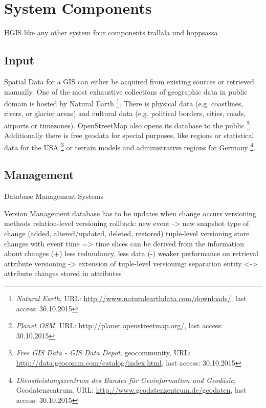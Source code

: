 

\section{System Components} %
\label{sec:system_components}

HGIS like any other system four components
trallala und hoppsassa

\subsection{Input} %
\label{sub:input}

Spatial Data for a GIS can either be acquired from existing sources or retrieved manually. One of the most exhaustive collections of geographic data in public domain is hosted by Natural Earth
\footnote{
  \textit{Natural Earth},
  URL: \url{http://www.naturalearthdata.com/downloads/},
  last access: 30.10.2015
}.
There is physical data (e.g. coastlines, rivers, or glacier areas) and cultural data (e.g. political borders, cities, roads, airports or timezones). OpenStreetMap also opens its database to the public
\footnote{
  \textit{Planet OSM},
  URL: \url{http://planet.openstreetmap.org/},
  last access: 30.10.2015
}.
Additionally there is free geodata for special purposes, like regions or statistical data for the USA
\footnote{
  \textit{Free GIS Data - GIS Data Depot},
  geocommunity,
  URL: \url{http://data.geocomm.com/catalog/index.html},
  last access: 30.10.2015
}
or terrain models and administrative regions for Germany
\footnote{
  \textit{Dienstleistungszentrum des Bundes für Geoinformation und Geodäsie},
  Geodatenzentrum,
  URL: \url{http://www.geodatenzentrum.de/geodaten},
  last access: 30.10.2015
}.


\subsection{Management} %
\label{sub:management}

Database Management Systems

Version Management
  database has to be updates when change occurs
  versioning methods
    relation-level versioning
      rollback: new event -> new snapshot
      type of change (added, altered/updated, deleted, restored)
    tuple-level versioning
      store changes with event time
      => time slices can be derived from the information about changes
      (+) less redundancy, less data
      (-) weaker performance on retrieval
    attribute versioning
      -> extension of tuple-level versioning: separation entity <-> attribute
      changes stored in attributes

